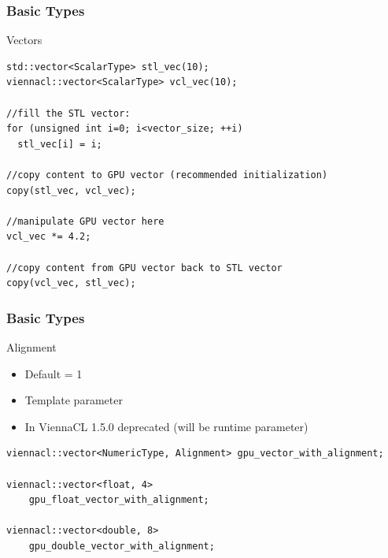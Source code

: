 \begin{frame}[fragile]
\frametitle{Basic Types}

\begin{block}{Vectors}
  \begin{lstlisting}
std::vector<ScalarType> stl_vec(10);
viennacl::vector<ScalarType> vcl_vec(10);

//fill the STL vector:
for (unsigned int i=0; i<vector_size; ++i)
  stl_vec[i] = i;

//copy content to GPU vector (recommended initialization)
copy(stl_vec, vcl_vec);

//manipulate GPU vector here
vcl_vec *= 4.2;

//copy content from GPU vector back to STL vector
copy(vcl_vec, stl_vec);
  \end{lstlisting}
\end{block}

\end{frame}




\begin{frame}[fragile]
\frametitle{Basic Types}

\begin{block}{Alignment}  
  \begin{itemize}
   \item Default = 1
   \item Template parameter
   \item In ViennaCL 1.5.0 deprecated (will be runtime parameter)
  \end{itemize}
  
  \begin{lstlisting}
viennacl::vector<NumericType, Alignment> gpu_vector_with_alignment;

viennacl::vector<float, 4>
    gpu_float_vector_with_alignment;

viennacl::vector<double, 8>
    gpu_double_vector_with_alignment;
  \end{lstlisting}
\end{block}

\end{frame}



